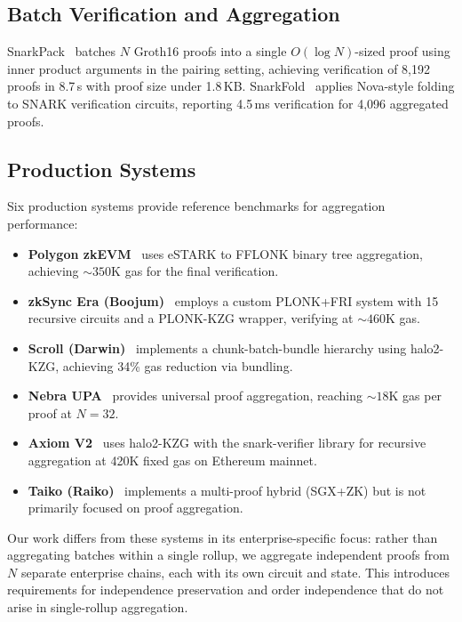 \subsection{Batch Verification and Aggregation}

SnarkPack~\cite{snarkpack} batches $N$ Groth16 proofs into a single
$O(\log N)$-sized proof using inner product arguments in the pairing
setting, achieving verification of 8,192 proofs in 8.7\,s with proof
size under 1.8\,KB. SnarkFold~\cite{snarkfold} applies Nova-style
folding to SNARK verification circuits, reporting 4.5\,ms verification
for 4,096 aggregated proofs.

\subsection{Production Systems}

Six production systems provide reference benchmarks for aggregation
performance:

\begin{itemize}
  \item \textbf{Polygon zkEVM}~\cite{polygon-zkevm} uses eSTARK to
    FFLONK binary tree aggregation, achieving ${\sim}350$K gas for the
    final verification.
  \item \textbf{zkSync Era (Boojum)}~\cite{zksync-era} employs a custom
    PLONK+FRI system with 15 recursive circuits and a PLONK-KZG wrapper,
    verifying at ${\sim}460$K gas.
  \item \textbf{Scroll (Darwin)}~\cite{scroll-darwin} implements a
    chunk-batch-bundle hierarchy using halo2-KZG, achieving 34\% gas
    reduction via bundling.
  \item \textbf{Nebra UPA}~\cite{nebra-upa} provides universal proof
    aggregation, reaching ${\sim}18$K gas per proof at $N{=}32$.
  \item \textbf{Axiom V2}~\cite{axiom-v2} uses halo2-KZG with the
    snark-verifier library for recursive aggregation at 420K fixed gas
    on Ethereum mainnet.
  \item \textbf{Taiko (Raiko)}~\cite{taiko-raiko} implements a
    multi-proof hybrid (SGX+ZK) but is not primarily focused on proof
    aggregation.
\end{itemize}

Our work differs from these systems in its enterprise-specific focus:
rather than aggregating batches within a single rollup, we aggregate
independent proofs from $N$ separate enterprise chains, each with its
own circuit and state. This introduces requirements for independence
preservation and order independence that do not arise in single-rollup
aggregation.
